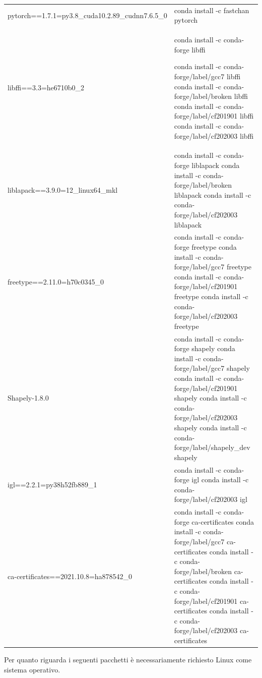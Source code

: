 \begin{table}
\begin{tabular}{ |p{8cm}||p{8cm}|  }
  pytorch==1.7.1=py3.8\_cuda10.2.89\_cudnn7.6.5\_0&	conda install -c fastchan pytorch\\


libffi==3.3=he6710b0\_2&conda install -c conda-forge libffi 

conda install -c conda-forge/label/gcc7 libffi 
conda install -c conda-forge/label/broken libffi 
conda install -c conda-forge/label/cf201901 libffi 
conda install -c conda-forge/label/cf202003 libffi\\

  liblapack==3.9.0=12\_linux64\_mkl&	conda install -c conda-forge liblapack  	conda install -c conda-forge/label/broken liblapack 	conda install -c conda-forge/label/cf202003 liblapack\\


  freetype==2.11.0=h70c0345\_0&	conda install -c conda-forge freetype  	conda install -c conda-forge/label/gcc7 freetype 	conda install -c conda-forge/label/cf201901 freetype 	conda install -c conda-forge/label/cf202003 freetype\\


  Shapely-1.8.0&	conda install -c conda-forge shapely 	conda install -c conda-forge/label/gcc7 shapely 	conda install -c conda-forge/label/cf201901 shapely 	conda install -c conda-forge/label/cf202003 shapely 	conda install -c conda-forge/label/shapely\_dev shapely\\




  igl==2.2.1=py38h52fb889\_1&	conda install -c conda-forge igl  	conda install -c conda-forge/label/cf202003 igl\\


  ca-certificates==2021.10.8=ha878542\_0&	conda install -c conda-forge ca-certificates  	conda install -c conda-forge/label/gcc7 ca-certificates  	conda install -c conda-forge/label/broken ca-certificates  	conda install -c conda-forge/label/cf201901 ca-certificates 	conda install -c conda-forge/label/cf202003 ca-certificates\\



\end{tabular}
\end{table}

\newpage

Per quanto riguarda i seguenti pacchetti è necessariamente richiesto Linux come sistema operativo.

